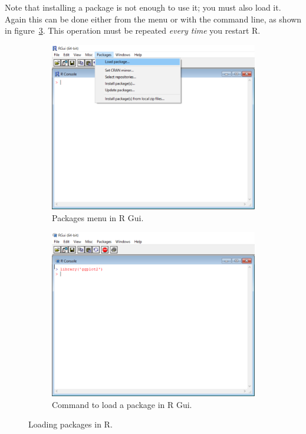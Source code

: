 \documentclass{report}
\begin{document}
		Note that installing a package is not enough to use it; you must also load it. Again this can be done either from the menu or with the command line, as shown in figure~\ref{fig:load}. This operation must be repeated \emph{every time} you restart R.
		\begin{figure}[h]
			\centering
			\begin{subfigure}[t]{0.475\textwidth}
				\centering
				\includegraphics[width=\textwidth]{load.png}
				\caption{Packages menu in R Gui.}
				\label{fig:loadmenu}
			\end{subfigure}
			\hfill
			\begin{subfigure}[t]{0.475\textwidth}
				\centering
				\includegraphics[width=\textwidth]{cli.png}
				\caption{Command to load a package in R Gui.}
				\label{fig:cli}
			\end{subfigure}
			\caption{Loading packages in R.}
			\label{fig:load}
		\end{figure}
	
\end{document}
